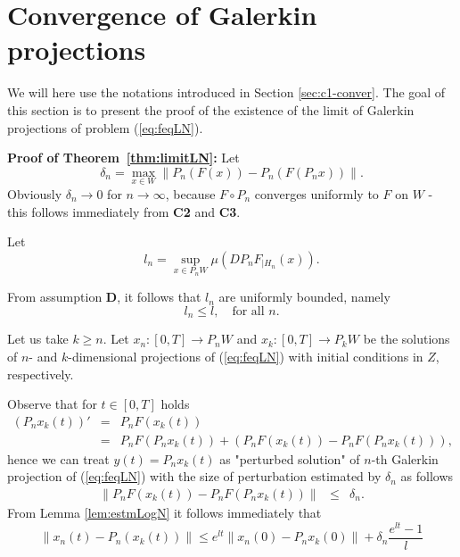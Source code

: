 \section{Convergence of Galerkin projections}
\label{sec:limitlogn}


We will here use  the notations introduced in Section
\ref{sec:c1-conver}.
The goal of this section is to present the proof of the
existence of the  limit of Galerkin projections of problem (\ref{eq:feqLN}).


\noindent
\textbf{Proof of Theorem~\ref{thm:limitLN}:}
Let
\begin{displaymath}
\delta_n= \max_{x \in W} \|P_n(F(x)) - P_n(F(P_n x))\|.
\end{displaymath}
 Obviously $\delta_n \to 0$ for $n \to \infty $, because $F \circ
 P_n$ converges uniformly to $F$ on $W$ - this follows immediately from \textbf{C2} and \textbf{C3}.

Let
\begin{equation}
   l_n=\sup_{x \in P_n W}\mu\left(D P_n F_{|H_n} (x) \right).
\end{equation}

From  assumption {\bf D}, it follows that  $l_n$ are uniformly
bounded, namely
\begin{equation}
  l_n \leq l, \quad \mbox{for all $n$}.
\end{equation}

Let us take $k \geq n$. Let $x_n:[0,T] \to P_nW$ and $x_k:[0,T]
\to P_k W$ be the solutions of $n$- and $k$-dimensional
projections of (\ref{eq:feqLN}) with initial conditions in $Z$, respectively.

Observe that for $t \in [0,T]$ holds
\begin{eqnarray*}
  (P_n x_k(t))'&=&P_n F(x_k(t))\\
  &=&P_n F(P_nx_k(t)) + (P_n F(x_k(t)) - P_n F(P_nx_k(t)) ),
\end{eqnarray*}
hence we can treat $y(t)=P_n x_k(t)$ as "perturbed solution" of $n$-th Galerkin projection of (\ref{eq:feqLN}) with the size of perturbation
 estimated by $\delta_n$ as follows
\begin{eqnarray*}
  \|P_n F(x_k(t)) - P_n F(P_nx_k(t))\| &\leq& \delta_n.
\end{eqnarray*}
 From Lemma \ref{lem:estmLogN} it
follows immediately that
\begin{equation}
  \|x_n(t) - P_n(x_k(t))\| \leq e^{lt}\|x_n(0) - P_nx_k(0)\| + \delta_n \frac{e^{lt} - 1}{l}
  \label{eq:estmdiffg}
\end{equation}

